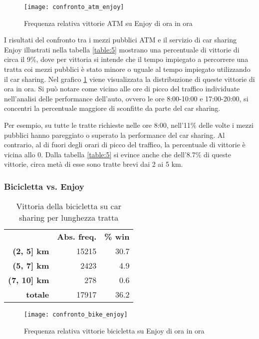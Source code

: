 \begin{figure}[H]
\texttt{[image: confronto\_atm\_enjoy]}
\caption{Frequenza relativa vittorie ATM su Enjoy di ora in ora}
\label{image:13}
\end{figure}

I risultati del confronto tra i mezzi pubblici ATM e il servizio di car sharing Enjoy illustrati nella tabella \ref{table:5} mostrano una percentuale di vittorie di circa il 9\%, dove per vittoria si intende che il tempo impiegato a percorrere una tratta coi mezzi pubblici è stato minore o uguale al tempo impiegato utilizzando il car sharing. Nel grafico \ref{image:13} viene visualizzata la distribuzione di queste vittorie di ora in ora. Si può notare come vicino alle ore di picco del traffico individuate nell'analisi delle performance dell'auto, ovvero le ore 8:00-10:00 e 17:00-20:00, si concentri la percentuale maggiore di sconfitte da parte del car sharing.

Per esempio, su tutte le tratte richieste nelle ore 8:00, nell'11\% delle volte i mezzi pubblici hanno pareggiato o superato la performance del car sharing. Al contrario, al di fuori degli orari di picco del traffico, la percentuale di vittorie è vicina allo 0. Dalla tabella \ref{table:5} si evince anche che dell'8.7\% di queste vittorie, circa metà di esse sono tratte brevi dai 2 ai 5 km.

\subsubsection{Bicicletta vs. Enjoy}

\begin{table}[H]
\centering
\begin{tabular}{ | r r r | }
\hline
& \textbf{Abs. freq.} & \textbf{\% win} \\
\textbf{(2, 5] km} & 15215 & 30.7 \\
\textbf{(5, 7] km} & 2423 & 4.9 \\
\textbf{(7, 10] km} & 278 & 0.6 \\
\hline
\textbf{totale} & 17917 & 36.2 \\
\hline
\end{tabular}
\caption{Vittoria della bicicletta su car sharing per lunghezza tratta}
\label{table:6}
\end{table}

\begin{figure}[H]
\texttt{[image: confronto\_bike\_enjoy]}
\caption{Frequenza relativa vittorie bicicletta su Enjoy di ora in ora}
\label{image:14}
\end{figure}

